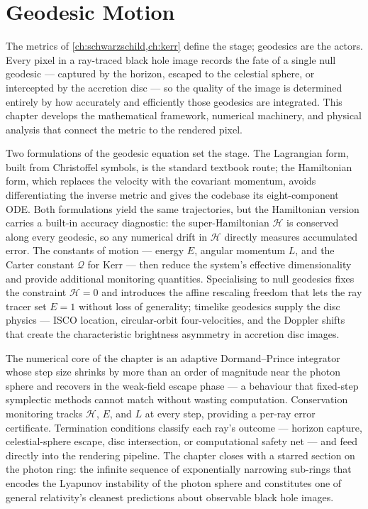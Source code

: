 \chapter{Geodesic Motion}
\label{ch:geodesics}

The metrics of \cref{ch:schwarzschild,ch:kerr} define the stage; geodesics
are the actors.  Every pixel in a ray-traced black hole image records the
fate of a single null geodesic --- captured by the horizon, escaped to the
celestial sphere, or intercepted by the accretion disc --- so the quality
of the image is determined entirely by how accurately and efficiently those
geodesics are integrated.  This chapter develops the mathematical framework,
numerical machinery, and physical analysis that connect the metric to the
rendered pixel.

Two formulations of the geodesic equation set the stage.  The Lagrangian
form, built from Christoffel symbols, is the standard textbook route; the
Hamiltonian form, which replaces the velocity with the covariant momentum,
avoids differentiating the inverse metric and gives the codebase its
eight-component ODE.  Both formulations yield the same trajectories, but
the Hamiltonian version carries a built-in accuracy diagnostic: the
super-Hamiltonian $\mathcal{H}$ is conserved along every geodesic, so any
numerical drift in $\mathcal{H}$ directly measures accumulated error.
The constants of motion --- energy $E$, angular momentum $L$, and the
Carter constant $\mathcal{Q}$ for Kerr --- then reduce the system's
effective dimensionality and provide additional monitoring quantities.
Specialising to null geodesics fixes the constraint $\mathcal{H} = 0$
and introduces the affine rescaling freedom that lets the ray tracer set
$E = 1$ without loss of generality; timelike geodesics supply the disc
physics --- ISCO location, circular-orbit four-velocities, and the
Doppler shifts that create the characteristic brightness asymmetry in
accretion disc images.

The numerical core of the chapter is an adaptive Dormand--Prince integrator
whose step size shrinks by more than an order of magnitude near the photon
sphere and recovers in the weak-field escape phase --- a behaviour that
fixed-step symplectic methods cannot match without wasting computation.
Conservation monitoring tracks $\mathcal{H}$, $E$, and $L$ at every step,
providing a per-ray error certificate.  Termination conditions classify
each ray's outcome --- horizon capture, celestial-sphere escape,
disc intersection, or computational safety net --- and feed directly into
the rendering pipeline.  The chapter closes with a starred section on the
photon ring: the infinite sequence of exponentially narrowing sub-rings
that encodes the Lyapunov instability of the photon sphere and constitutes
one of general relativity's cleanest predictions about observable
black hole images.

